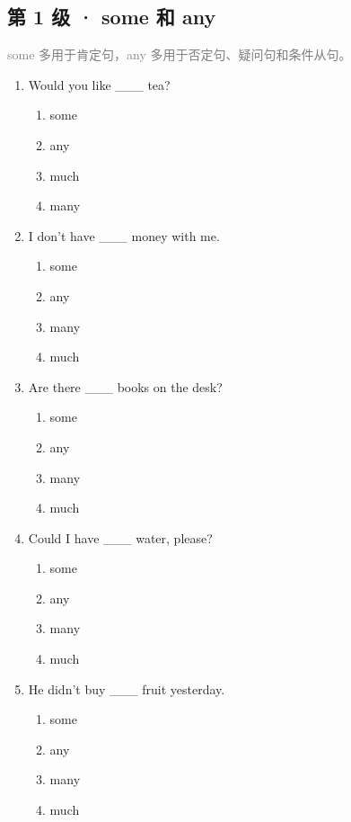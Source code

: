 \documentclass[11pt,a4paper]{ctexart}
\begin{document}
\subsection*{第 1 级 · some 和 any}
\noindent\textcolor{gray}{some 多用于肯定句，any 多用于否定句、疑问句和条件从句。}\par\smallskip
\begin{enumerate}[leftmargin=*,itemsep=4pt]
\item Would you like \_\_\_ tea?
\begin{enumerate}[label=\Alph*.,leftmargin=2em,itemsep=1pt,topsep=2pt]
\item some
\item any
\item much
\item many
\end{enumerate}
\item I don’t have \_\_\_ money with me.
\begin{enumerate}[label=\Alph*.,leftmargin=2em,itemsep=1pt,topsep=2pt]
\item some
\item any
\item many
\item much
\end{enumerate}
\item Are there \_\_\_ books on the desk?
\begin{enumerate}[label=\Alph*.,leftmargin=2em,itemsep=1pt,topsep=2pt]
\item some
\item any
\item many
\item much
\end{enumerate}
\item Could I have \_\_\_ water, please?
\begin{enumerate}[label=\Alph*.,leftmargin=2em,itemsep=1pt,topsep=2pt]
\item some
\item any
\item many
\item much
\end{enumerate}
\item He didn’t buy \_\_\_ fruit yesterday.
\begin{enumerate}[label=\Alph*.,leftmargin=2em,itemsep=1pt,topsep=2pt]
\item some
\item any
\item many
\item much

\end{enumerate}
\end{enumerate}
\end{document}
